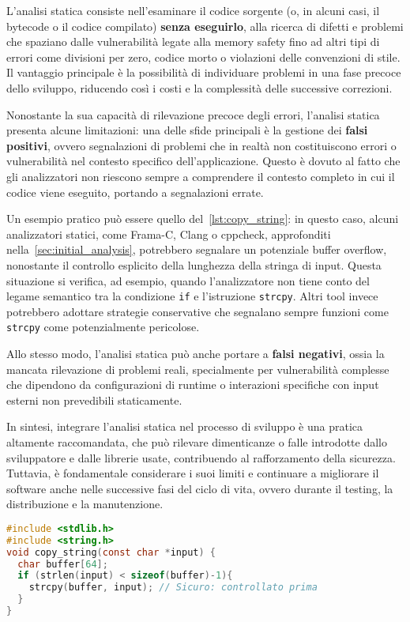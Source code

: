 L'analisi statica consiste nell'esaminare il codice sorgente (o, in alcuni casi,
il bytecode o il codice compilato) \textbf{senza eseguirlo}, alla ricerca di difetti
e problemi che spaziano dalle vulnerabilità legate alla memory safety fino ad altri
tipi di errori come divisioni per zero, codice morto o violazioni delle
convenzioni di stile. Il vantaggio principale è la possibilità di individuare problemi
in una fase precoce dello sviluppo, riducendo così i costi e la complessità
delle successive correzioni.

Nonostante la sua capacità di rilevazione precoce degli errori, l'analisi statica
presenta alcune limitazioni: una delle sfide principali è la gestione dei
\textbf{falsi positivi}, ovvero segnalazioni di problemi che in realtà non
costituiscono errori o vulnerabilità nel contesto specifico dell'applicazione. Questo
è dovuto al fatto che gli analizzatori non riescono sempre a comprendere il contesto
completo in cui il codice viene eseguito, portando a segnalazioni errate.

Un esempio pratico può essere quello del~\autoref{lst:copy_string}: in questo caso,
alcuni analizzatori statici, come Frama-C, Clang o cppcheck, approfonditi nella~\autoref{sec:initial_analysis},
potrebbero segnalare un potenziale buffer overflow, nonostante il controllo esplicito
della lunghezza della stringa di input. Questa situazione si verifica, ad esempio,
quando l'analizzatore non tiene conto del legame semantico tra la condizione
\texttt{if} e l'istruzione \texttt{strcpy}. Altri tool invece potrebbero adottare
strategie conservative che segnalano sempre funzioni come \texttt{strcpy} come
potenzialmente pericolose.

Allo stesso modo, l'analisi statica può anche portare a \textbf{falsi negativi},
ossia la mancata rilevazione di problemi reali, specialmente per vulnerabilità
complesse che dipendono da configurazioni di runtime o interazioni specifiche
con input esterni non prevedibili staticamente.

In sintesi, integrare l'analisi statica nel processo di sviluppo è una pratica altamente
raccomandata, che può rilevare dimenticanze o falle introdotte dallo
sviluppatore e dalle librerie usate, contribuendo al rafforzamento della sicurezza.
Tuttavia, è fondamentale considerare i suoi limiti e continuare a migliorare il software
anche nelle successive fasi del ciclo di vita, ovvero durante il testing, la distribuzione
e la manutenzione.

\bigskip
\begin{lstlisting}[language=C, caption={Copia sicura di una stringa con \texttt{strcpy()}}, label={lst:copy_string}]
#include <stdlib.h>
#include <string.h>
void copy_string(const char *input) {
  char buffer[64];
  if (strlen(input) < sizeof(buffer)-1){
    strcpy(buffer, input); // Sicuro: controllato prima
  }
}
\end{lstlisting}